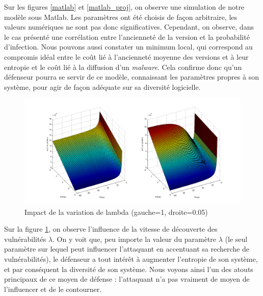 Sur les figures \ref{matlab} et \ref{matlab_proj}, on observe une simulation de notre modèle sous Matlab. Les paramètres ont été choisis de façon arbitraire, les valeurs numériques ne sont pas donc significatives. Cependant, on observe, dans le cas présenté une corrélation entre l’ancienneté de la version et la probabilité d’infection. Nous pouvons aussi constater un minimum local, qui correspond au compromis idéal entre le coût lié à l'ancienneté moyenne des versions et à leur entropie et le coût lié à la diffusion d'un \textit{malware}. Cela confirme donc qu'un défenseur pourra se servir de ce modèle, connaissant les paramètres propres à son système, pour agir de façon adéquate sur sa diversité logicielle.

\begin{figure}[!ht]
\centering
     \includegraphics[width=1.0\linewidth]{Paul/Matlab/lambda_var.png}
     \caption{Impact de la variation de lambda (gauche=1, droite=0.05)}
     \label{lambda}
\end{figure}

Sur la figure \ref{lambda}, on observe l'influence de la vitesse de découverte des vulnérabilités $\lambda$. On y voit que, peu importe la valeur du paramètre $\lambda$ (le seul paramètre sur lequel peut influencer l'attaquant en accentuant sa recherche de vulnérabilités), le défenseur a tout intérêt à augmenter l'entropie de son système, et par conséquent la diversité de son système. Nous voyons ainsi l'un des atouts principaux de ce moyen de défense : l'attaquant n'a pas vraiment de moyen de l'influencer et de le contourner.
